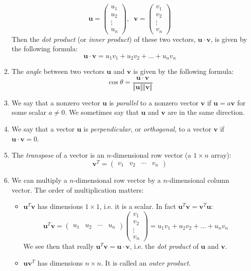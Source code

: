 \documentclass[11pt]{article}
\renewcommand*{\vec}[1]{\mathbf{#1}}
\begin{document}
\begin{enumerate}
$$\vec{u} = \begin{pmatrix} u_1 \\ u_2 \\ \vdots \\ u_n \end{pmatrix}, \;\; \vec{v} = \begin{pmatrix} v_1 \\ v_2 \\ \vdots \\ v_n \end{pmatrix}$$
Then the \emph{dot product} (or \emph{inner product}) of these two vectors, $\vec{u}\cdot\vec{v}$, is given by the following formula:
$$\boxed{\vec{u}\cdot\vec{v} = u_1v_1 + u_2v_2 + ... + u_nv_n}$$
\item The \emph{angle} between two vectors $\vec{u}$ and $\vec{v}$ is given by the following formula:
$$\boxed{\cos{\theta} = \frac{\vec{u}\cdot\vec{v}}{\Vert \vec{u}\Vert\Vert\vec{v}\Vert}}$$
\item We say that a nonzero vector $\vec{u}$ is \emph{parallel} to a nonzero vector $\vec{v}$ if $\boxed{\vec{u} = a\vec{v}}$ for some scalar $a\neq 0$. We sometimes say that $\vec{u}$ and $\vec{v}$ are in the same direction.
\item We say that a vector $\vec{u}$ is \emph{perpendicular}, or \emph{orthogonal}, to a vector $\vec{v}$ if $\boxed{\vec{u}\cdot\vec{v} = 0}$. 
\item The \emph{transpose} of a vector is an $n$-dimensional row vector (a $1\times n$ array):
$$\boxed{\vec{v}^T = \begin{pmatrix} v_1 & v_2 & \cdots & v_n \end{pmatrix}}$$
\item We can multiply a $n$-dimensional row vector by a $n$-dimensional column vector. The order of multiplication matters:
\begin{itemize}
\item $\vec{u}^T \vec{v}$ has dimensions $1\times 1$, i.e. it is a scalar. In fact $\vec{u}^T\vec{v} = \vec{v}^T\vec{u}$:
$$\vec{u}^T \vec{v} = \begin{pmatrix} u_1 & u_2 & \cdots & u_n \end{pmatrix}  \begin{pmatrix} v_1 \\ v_2 \\ \vdots \\ v_n \end{pmatrix} = u_1v_1 + u_2v_2 + ... + u_nv_n$$
We see then that really $\vec{u}^T\vec{v} = \vec{u}\cdot\vec{v}$, i.e. the \emph{dot product} of $\vec{u}$ and $\vec{v}$. 
\item $\vec{u} \vec{v}^T$ has dimensions $n\times n$. It is called an \emph{outer product}. 
\end{itemize}
\end{enumerate}
\end{document}
